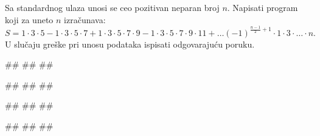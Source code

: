 \begin{Exercise}[difficulty=1, label=p1.7_] 
Sa standardnog ulaza unosi se ceo pozitivan neparan broj $n$.
Napisati program koji za uneto $n$ izračunava:
$$S = 1\cdot3\cdot5 - 1\cdot3\cdot5\cdot7 + 1\cdot3\cdot5\cdot7\cdot9
- 1\cdot3\cdot5\cdot7\cdot9\cdot11 + \ldots
(-1)^{\frac{n-1}{2}+1}\cdot1\cdot3\cdot \ldots \cdot n.$$ U slučaju
greške pri unosu podataka ispisati odgovarajuću poruku. 
  
\begin{miditest}
\begin{upotreba}{1}
#\naslovInt#
##
##
\end{upotreba}
\end{miditest}
\begin{miditest}
\begin{upotreba}{2}
#\naslovInt#
##
##
\end{upotreba}
\end{miditest}

\begin{miditest}
\begin{upotreba}{3}
#\naslovInt#
##
##
\end{upotreba}
\end{miditest}
\begin{miditest}
\begin{upotreba}{4}
#\naslovInt#
##
##
\end{upotreba}
\end{miditest}
\end{Exercise}
\begin{Answer}[ref=p1.7_]
\end{Answer}


